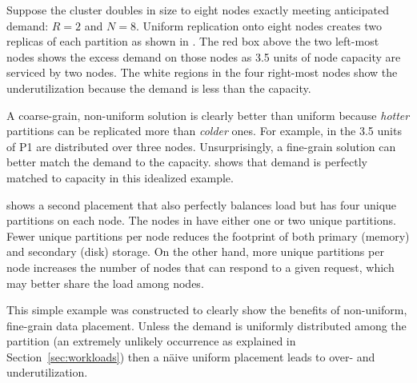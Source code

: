 Suppose the cluster doubles in size to eight nodes exactly meeting
anticipated demand: $R=2$ and $N=8$.
Uniform replication onto eight nodes creates two replicas of each
partition as shown in \myfigure{\ref{fig:dp_uniform}}.
The red box above the two left-most nodes shows the excess demand on those
nodes as 3.5 units of node capacity are serviced by two nodes.
The white regions in the four right-most nodes show the
underutilization because the demand is less than the capacity.

A coarse-grain, non-uniform solution is clearly better
than uniform because \emph{hotter} partitions can be
replicated more than \emph{colder} ones.
For example, in \myfigure{\ref{fig:dp_coarse}} the 3.5 units of P1 are
distributed over three nodes.
Unsurprisingly, a fine-grain solution can better match the demand to
the capacity.
\myfigure{\ref{fig:dp_fine_monochromatic}} shows that demand is perfectly matched to
capacity in this idealized example.


\myfigure{\ref{fig:dp_fine_rainbow}} shows a second placement that also
perfectly balances load but has four unique partitions on each
node.
The nodes in \myfigure{\ref{fig:dp_fine_monochromatic}} have either
one or two unique partitions.
Fewer unique partitions per node reduces the footprint of both primary
(memory) and secondary (disk) storage.
On the other hand,
more unique partitions per node increases the number of nodes that can
respond to a given request, which may better share the load among nodes.

This simple example was constructed to clearly show
the benefits of non-uniform, fine-grain data placement.
Unless the demand is uniformly distributed among the partition (an
extremely unlikely occurrence as explained in
Section~\ref{sec:workloads}) then a n\"aive uniform placement leads to
over- and underutilization.


